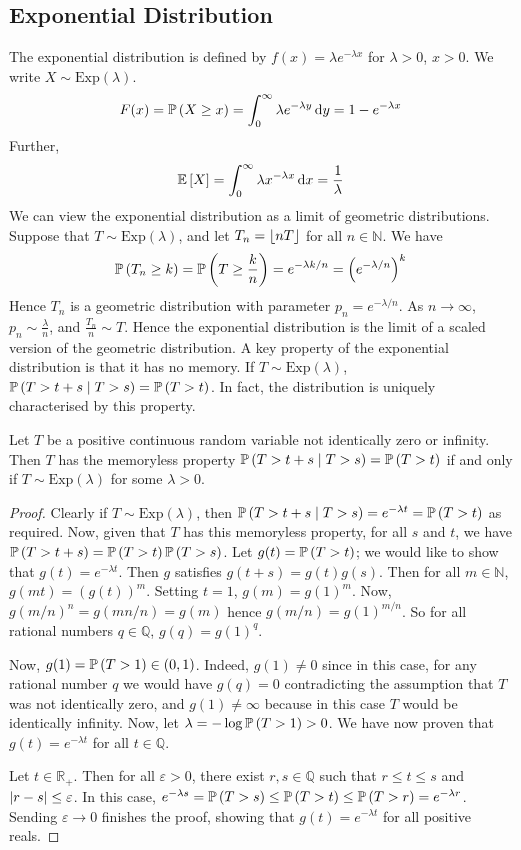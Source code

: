 \documentclass{article}
\begin{document}
\subsection{Exponential Distribution}
The exponential distribution is defined by $f(x) = \lambda e^{-\lambda x}$ for $\lambda > 0$, $x > 0$. We write $X \sim \mathrm{Exp}(\lambda)$.
\[ F(x) = \mathbb{P}\left({X \geq x}\right) = \int_0^\infty \lambda e^{-\lambda y} \dd{y} = 1 - e^{-\lambda x} \]
Further,
\[ \mathbb{E}\left[{X}\right] = \int_0^\infty \lambda x^{-\lambda x} \dd{x} = \frac{1}{\lambda} \]
We can view the exponential distribution as a limit of geometric distributions. Suppose that $T \sim \mathrm{Exp}(\lambda)$, and let $T_n = \lfloor nT\rfloor$ for all $n \in \mathbb N$. We have
\[ \mathbb{P}\left({T_n \geq k}\right) = \mathbb{P}\left({T \geq \frac{k}{n}}\right) = e^{-\lambda k / n} = \left( e^{-\lambda/n} \right)^k \]
Hence $T_n$ is a geometric distribution with parameter $p_n = e^{-\lambda/n}$. As $n \to \infty$, $p_n \sim \frac{\lambda}{n}$, and $\frac{T_n}{n} \sim T$. Hence the exponential distribution is the limit of a scaled version of the geometric distribution. A key property of the exponential distribution is that it has no memory. If $T \sim \mathrm{Exp}(\lambda)$, $\mathbb{P}\left({T > t + s \mid T > s}\right) = \mathbb{P}\left({T > t}\right)$. In fact, the distribution is uniquely characterised by this property.
\begin{proposition}
	Let $T$ be a positive continuous random variable not identically zero or infinity. Then $T$ has the memoryless property $\mathbb{P}\left({T > t + s \mid T > s}\right) = \mathbb{P}\left({T > t}\right)$ if and only if $T \sim \mathrm{Exp}(\lambda)$ for some $\lambda > 0$.
\end{proposition}
\begin{proof}
	Clearly if $T \sim \mathrm{Exp}(\lambda)$, then $\mathbb{P}\left({T > t + s \mid T > s}\right) = e^{-\lambda t} = \mathbb{P}\left({T > t}\right)$ as required. Now, given that $T$ has this memoryless property, for all $s$ and $t$, we have $\mathbb{P}\left({T > t + s}\right) = \mathbb{P}\left({T > t}\right) \mathbb{P}\left({T > s}\right)$. Let $g(t) = \mathbb{P}\left({T > t}\right)$; we would like to show that $g(t) = e^{-\lambda t}$. Then $g$ satisfies $g(t+s) = g(t)g(s)$. Then for all $m \in \mathbb N$, $g(mt) = (g(t))^m$. Setting $t=1$, $g(m) = g(1)^m$. Now, $g(m/n)^n = g(mn/n) = g(m)$ hence $g(m/n) = g(1)^{m/n}$. So for all rational numbers $q \in \mathbb Q$, $g(q) = g(1)^q$.

	Now, $g(1) = \mathbb{P}\left({T > 1}\right) \in (0, 1)$. Indeed, $g(1) \neq 0$ since in this case, for any rational number $q$ we would have $g(q) = 0$ contradicting the assumption that $T$ was not identically zero, and $g(1) \neq \infty$ because in this case $T$ would be identically infinity. Now, let $\lambda = -\log\mathbb{P}\left({T > 1}\right) > 0$. We have now proven that $g(t) = e^{-\lambda t}$ for all $t\in\mathbb Q$.

	Let $t \in \mathbb R_+$. Then for all $\varepsilon > 0$, there exist $r, s \in \mathbb Q$ such that $r \leq t \leq s$ and $\abs{r - s} \leq \varepsilon$. In this case, $e^{-\lambda s} = \mathbb{P}\left({T > s}\right) \leq \mathbb{P}\left({T > t}\right) \leq \mathbb{P}\left({T > r}\right) = e^{-\lambda r}$. Sending $\varepsilon \to 0$ finishes the proof, showing that $g(t) = e^{-\lambda t}$ for all positive reals.
\end{proof}
\end{document}
